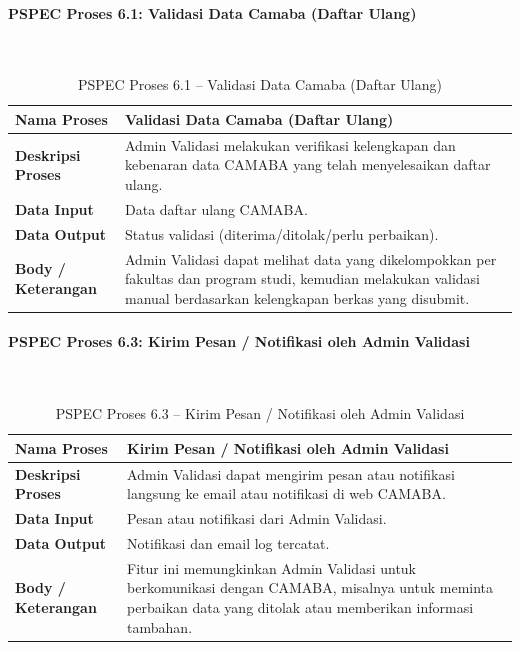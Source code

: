 \paragraph{PSPEC Proses 6.1: Validasi Data Camaba (Daftar Ulang)}~\\
\begin{longtable}{|p{}|p{}|}
	\caption{PSPEC Proses 6.1 -- Validasi Data Camaba (Daftar Ulang)}
	\label{table:3.pspec61}\\
	\hline
	\textbf{Nama Proses} & Validasi Data Camaba (Daftar Ulang) \\
	\hline
	\textbf{Deskripsi Proses} & Admin Validasi melakukan verifikasi kelengkapan dan kebenaran data CAMABA yang telah menyelesaikan daftar ulang. \\
	\hline
	\textbf{Data Input} & Data daftar ulang CAMABA. \\
	\hline
	\textbf{Data Output} & Status validasi (diterima/ditolak/perlu perbaikan). \\
	\hline
	\textbf{Body / Keterangan} & Admin Validasi dapat melihat data yang dikelompokkan per fakultas dan program studi, kemudian melakukan validasi manual berdasarkan kelengkapan berkas yang disubmit. \\
	\hline
\end{longtable}

\paragraph{PSPEC Proses 6.3: Kirim Pesan / Notifikasi oleh Admin Validasi}~\\
\begin{longtable}{|p{}|p{}|}
	\caption{PSPEC Proses 6.3 -- Kirim Pesan / Notifikasi oleh Admin Validasi}
	\label{table:3.pspec63}\\
	\hline
	\textbf{Nama Proses} & Kirim Pesan / Notifikasi oleh Admin Validasi \\
	\hline
	\textbf{Deskripsi Proses} & Admin Validasi dapat mengirim pesan atau notifikasi langsung ke email atau notifikasi di web CAMABA. \\
	\hline
	\textbf{Data Input} & Pesan atau notifikasi dari Admin Validasi. \\
	\hline
	\textbf{Data Output} & Notifikasi dan email log tercatat. \\
	\hline
	\textbf{Body / Keterangan} & Fitur ini memungkinkan Admin Validasi untuk berkomunikasi dengan CAMABA, misalnya untuk meminta perbaikan data yang ditolak atau memberikan informasi tambahan. \\
	\hline
\end{longtable}

